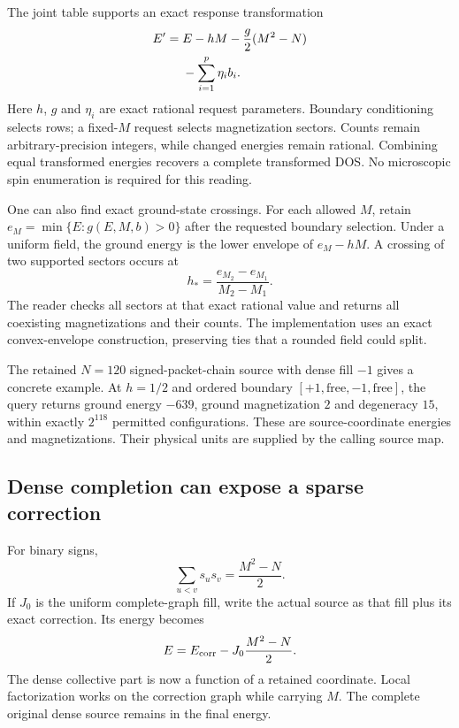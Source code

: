 The joint table supports an exact response transformation
\begin{align}
 E'={}&E-hM-\frac{g}{2}(M^2-N)\notag\\
 &-\sum_{i=1}^{p}\eta_i b_i.
\end{align}
Here $h$, $g$ and $\eta_i$ are exact rational request parameters. Boundary conditioning selects rows; a fixed-$M$ request selects magnetization sectors. Counts remain arbitrary-precision integers, while changed energies remain rational. Combining equal transformed energies recovers a complete transformed DOS. No microscopic spin enumeration is required for this reading.

One can also find exact ground-state crossings. For each allowed $M$, retain $e_M=\min\{E:g(E,M,b)>0\}$ after the requested boundary selection. Under a uniform field, the ground energy is the lower envelope of $e_M-hM$. A crossing of two supported sectors occurs at
\begin{equation}
 h_* = \frac{e_{M_2}-e_{M_1}}{M_2-M_1}.
\end{equation}
The reader checks all sectors at that exact rational value and returns all coexisting magnetizations and their counts. The implementation uses an exact convex-envelope construction, preserving ties that a rounded field could split.

The retained $N=120$ signed-packet-chain source with dense fill $-1$ gives a concrete example. At $h=1/2$ and ordered boundary $[+1,\text{free},-1,\text{free}]$, the query returns ground energy $-639$, ground magnetization $2$ and degeneracy $15$, within exactly $2^{118}$ permitted configurations. These are source-coordinate energies and magnetizations. Their physical units are supplied by the calling source map.

\subsection{Dense completion can expose a sparse correction}

For binary signs,
\begin{equation}
 \sum_{u<v}s_us_v=\frac{M^2-N}{2}.
\end{equation}
If $J_0$ is the uniform complete-graph fill, write the actual source as that fill plus its exact correction. Its energy becomes
\begin{equation}
 E=E_{\rm corr}-J_0\frac{M^2-N}{2}.
\end{equation}
The dense collective part is now a function of a retained coordinate. Local factorization works on the correction graph while carrying $M$. The complete original dense source remains in the final energy.


